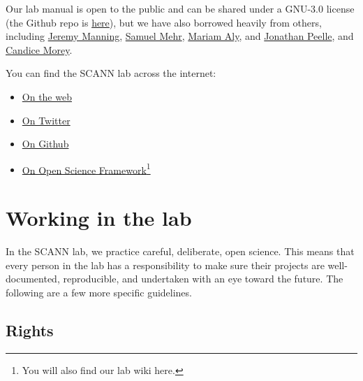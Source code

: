 \documentclass[
  12pt,
]{book}
\providecommand{\tightlist}{%
  \setlength{\itemsep}{0pt}\setlength{\parskip}{0pt}}
\begin{document}
Our lab manual is open to the public and can be shared under a GNU-3.0 license (the Github repo is \href{https://github.com/scann-lab/lab_manual}{here}), but we have also borrowed heavily from others, including \href{https://github.com/ContextLab/lab-manual}{Jeremy Manning}, \href{https://handbook-public.themusiclab.org/welcome}{Samuel Mehr}, \href{https://github.com/alylab/labmanual}{Mariam Aly}, and \href{https://github.com/jpeelle/peellelab_manual/}{Jonathan Peelle}, and \href{https://ccmorey.github.io/labHandbook/}{Candice Morey}.

You can find the SCANN lab across the internet:

\begin{itemize}
\tightlist
\item
  \href{https://scannlab.psych.ufl.edu}{On the web}
\item
  \href{https://twitter.com/scannlab}{On Twitter}
\item
  \href{https://github.com/scann-lab}{On Github}
\item
  \href{https://osf.io/4hbgz}{On Open Science Framework}\footnote{You will also find our lab wiki here.}
\end{itemize}

\hypertarget{working-in-the-lab}{%
\chapter{Working in the lab}\label{working-in-the-lab}}

In the SCANN lab, we practice careful, deliberate, open science. This means that every person in the lab has a responsibility to make sure their projects are well-documented, reproducible, and undertaken with an eye toward the future. The following are a few more specific guidelines.

\hypertarget{rights}{%
\section{Rights}\label{rights}}
\end{document}
